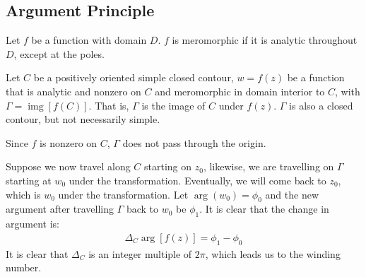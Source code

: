 \documentclass[12pt, english]{book}
\begin{document}
	\begin{figure}[H]
		\centering
	\end{figure}
	
	\subsection{Argument Principle} \label{Argument Principle Subsection - Complex}
	
	\begin{definition}[Meromorphic]
		Let \(f\) be a function with domain \(D\). \(f\) is meromorphic if it is analytic throughout \(D\), except at the poles.
	\end{definition}
	
	Let \(C\) be a positively oriented simple closed contour, \(w=f(z)\) be a function that is analytic and nonzero on \(C\) and meromorphic in domain interior to \(C\), with \(\Gamma = \operatorname{img}[f(C)]\). That is, \(\Gamma\) is the image of \(C\) under \(f(z)\). \(\Gamma\) is also a closed contour, but not necessarily simple.
	
	Since \(f\) is nonzero on \(C\), \(\Gamma\) does not pass through the origin.
	
	Suppose we now travel along \(C\) starting on \(z_0\), likewise, we are travelling on \(\Gamma\) starting at \(w_0\) under the transformation. Eventually, we will come back to \(z_0\), which is \(w_0\) under the transformation. Let \(\arg(w_0) = \phi_0\) and the new argument after travelling \(\Gamma\) back to \(w_0\) be \(\phi_1\). It is clear that the change in argument is:
	\begin{align*}
		\Delta_C \arg[f(z)] = \phi_1 - \phi_0
	\end{align*}
	It is clear that \(\Delta_C\) is an integer multiple of \(2\pi\), which leads us to the winding number. 
	
\end{document}
